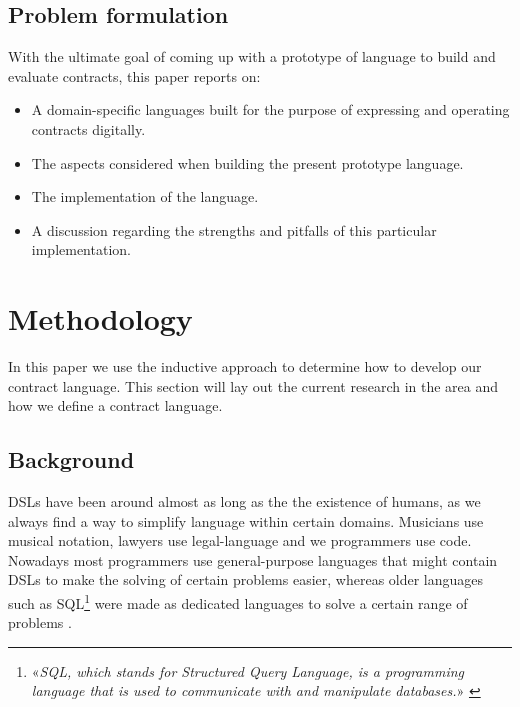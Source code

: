 \documentclass{ituthesis}
\begin{document}
\section{Problem formulation} %
With the ultimate goal of coming up with a prototype of language to build and evaluate contracts, this paper reports on:
\begin{itemize}
    \item A domain-specific languages built for the purpose of expressing and operating contracts digitally.
    \item The aspects considered when building the present prototype language.
    \item The implementation of the language.
    \item A discussion regarding the strengths and pitfalls of this particular implementation.
\end{itemize}

\chapter{Methodology}


In this paper we use the inductive approach to determine how to develop our contract language. This section will lay out the current research in the area and how we define a contract language.

\section{Background}
DSLs have been around almost as long as the the existence of humans, as we always find a way to simplify language within certain domains. Musicians use musical notation, lawyers use legal-language and we programmers use code. Nowadays most programmers use general-purpose languages that might contain DSLs to make the solving of certain problems easier, whereas older languages such as SQL\footnote{«\textit{SQL, which stands for Structured Query Language, is a programming language that is used to communicate with and manipulate databases.}» \cite{whatisSQL}} were made as dedicated languages to solve a certain range of problems \cite{van2000domain}.
\end{document}
